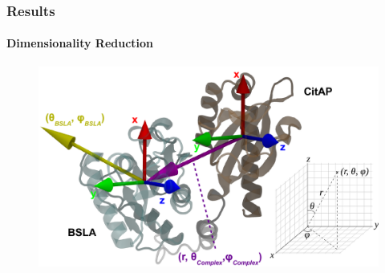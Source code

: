 \documentclass[english]{beamer}
\begin{document}

\begin{frame}
    \frametitle{Results}
    \framesubtitle{Dimensionality Reduction}

    \begin{figure}
        \includegraphics[width=1.0\textwidth]{figures/Collective_coords/collective_coords.pdf}
    \end{figure}        

\end{frame}     
 
\end{document}
